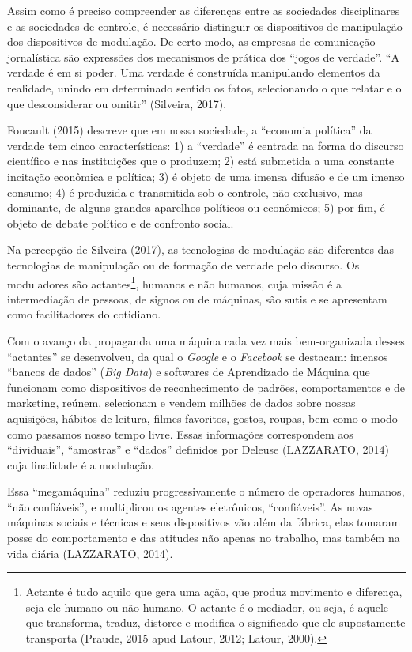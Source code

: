 Assim como é preciso compreender as diferenças entre as sociedades
disciplinares e as sociedades de controle, é necessário distinguir os
dispositivos de manipulação dos dispositivos de modulação. De certo
modo, as empresas de comunicação jornalística são expressões dos
mecanismos de prática dos ``jogos de verdade''. ``A verdade é em si
poder. Uma verdade é construída manipulando elementos da realidade,
unindo em determinado sentido os fatos, selecionando o que relatar e o
que desconsiderar ou omitir'' (Silveira, 2017).

Foucault (2015) descreve que em nossa sociedade, a ``economia política''
da verdade tem cinco características: 1) a ``verdade'' é centrada na
forma do discurso científico e nas instituições que o produzem; 2) está
submetida a uma constante incitação econômica e política; 3) é objeto de
uma imensa difusão e de um imenso consumo; 4) é produzida e transmitida
sob o controle, não exclusivo, mas dominante, de alguns grandes
aparelhos políticos ou econômicos; 5) por fim, é objeto de debate
político e de confronto social.

Na percepção de Silveira (2017), as tecnologias de modulação são
diferentes das tecnologias de manipulação ou de formação de verdade pelo
discurso. Os moduladores são actantes\footnote{Actante é tudo aquilo que
  gera uma ação, que produz movimento e diferença, seja ele humano ou
  não-humano. O actante é o mediador, ou seja, é aquele que transforma,
  traduz, distorce e modifica o significado que ele supostamente
  transporta (Praude, 2015 apud Latour, 2012; Latour, 2000).}, humanos e
não humanos, cuja missão é a intermediação de pessoas, de signos ou de
máquinas, são sutis e se apresentam como facilitadores do cotidiano.

Com o avanço da propaganda uma máquina cada vez mais bem-organizada
desses ``actantes'' se desenvolveu, da qual o \emph{Google} e o
\emph{Facebook} se destacam: imensos ``bancos de dados'' (\emph{Big
Data}) e softwares de Aprendizado de Máquina que funcionam como
dispositivos de reconhecimento de padrões, comportamentos e de
marketing, reúnem, selecionam e vendem milhões de dados sobre nossas
aquisições, hábitos de leitura, filmes favoritos, gostos, roupas, bem
como o modo como passamos nosso tempo livre. Essas informações
correspondem aos ``dividuais'', ``amostras'' e ``dados'' definidos por
Deleuse (LAZZARATO, 2014) cuja finalidade é a modulação.

Essa ``megamáquina'' reduziu progressivamente o número de operadores
humanos, ``não confiáveis'', e multiplicou os agentes eletrônicos,
``confiáveis''. As novas máquinas sociais e técnicas e seus dispositivos
vão além da fábrica, elas tomaram posse do comportamento e das atitudes
não apenas no trabalho, mas também na vida diária (LAZZARATO, 2014).

